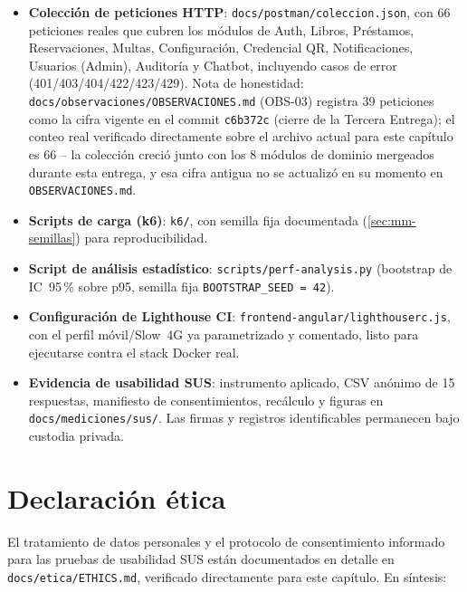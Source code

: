 \begin{itemize}[leftmargin=1.2cm]
  \item \textbf{Colección de peticiones HTTP}: \texttt{docs/postman/coleccion.json},
    con 66 peticiones reales que cubren los módulos de
    Auth, Libros, Préstamos, Reservaciones, Multas, Configuración,
    Credencial QR, Notificaciones, Usuarios (Admin), Auditoría y
    Chatbot, incluyendo casos de error (401/403/404/422/423/429). Nota
    de honestidad: \texttt{docs/observaciones/OBSERVACIONES.md} (OBS-03)
    registra 39 peticiones como la cifra vigente en el commit
    \texttt{c6b372c} (cierre de la Tercera Entrega); el conteo real
    verificado directamente sobre el archivo actual para este capítulo
    es 66 -- la colección creció junto con los 8 módulos de dominio
    mergeados durante esta entrega, y esa cifra antigua no se actualizó
    en su momento en \texttt{OBSERVACIONES.md}.
  \item \textbf{Scripts de carga (k6)}: \texttt{k6/}, con semilla fija
    documentada (\autoref{sec:mm-semillas}) para reproducibilidad.
  \item \textbf{Script de análisis estadístico}: \texttt{scripts/perf-analysis.py}
    (bootstrap de IC~95\,\% sobre p95, semilla fija \texttt{BOOTSTRAP\_SEED = 42}).
  \item \textbf{Configuración de Lighthouse CI}: \texttt{frontend-angular/lighthouserc.js},
    con el perfil móvil/Slow~4G ya parametrizado y comentado, listo para
    ejecutarse contra el stack Docker real.
  \item \textbf{Evidencia de usabilidad SUS}: instrumento aplicado,
    CSV anónimo de 15 respuestas, manifiesto de consentimientos,
    recálculo y figuras en \texttt{docs/mediciones/sus/}. Las firmas y
    registros identificables permanecen bajo custodia privada.
\end{itemize}

\section{Declaración ética}
\label{sec:decl-etica}

El tratamiento de datos personales y el protocolo de consentimiento
informado para las pruebas de usabilidad SUS están documentados en
detalle en \texttt{docs/etica/ETHICS.md}, verificado directamente para
este capítulo. En síntesis:

